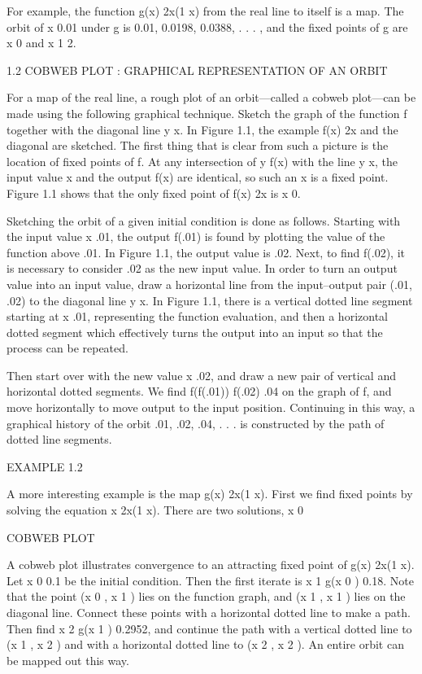 \documentclass[12pt]{article}
\begin{document}
For example, the function g(x)  2x(1  x) from the real line to itself is a map. The orbit of x  0.01 under 
g is 0.01, 0.0198, 0.0388, . . .  , and the fixed points of g are x  0 and x  1  2.

1.2 COBWEB PLOT : GRAPHICAL REPRESENTATION OF AN ORBIT

For a map of the real line, a rough plot of an orbit—called a cobweb plot—can be made using the following 
graphical technique. Sketch the graph of the function f together with the diagonal line y  x. In Figure 
1.1, the example f(x)  2x and the diagonal are sketched. The first thing that is clear from such a picture 
is the location of fixed points of f. At any intersection of y  f(x) with the line y  x,
the input value x and the output f(x) are identical, so such an x is a fixed point. Figure 1.1 shows that 
the only fixed point of f(x)  2x is x  0.

Sketching the orbit of a given initial condition is done as follows. Starting with the input value x  .01, 
the output f(.01) is found by plotting the value of the function above .01. In Figure 1.1, the output value 
is .02. Next, to find f(.02), it is necessary to consider .02 as the new input value. In order to turn an 
output value into an input value, draw a horizontal line from the input–output pair (.01, .02) to the 
diagonal line y  x. In Figure 1.1, there is a vertical dotted line segment starting at x  .01, representing 
the function evaluation, and then a horizontal dotted segment which effectively turns the output into an 
input so that the process can be repeated.

Then start over with the new value x  .02, and draw a new pair of vertical and horizontal dotted segments. 
We find f(f(.01))  f(.02)  .04 on the graph of f, and move horizontally to move output to the input 
position. Continuing in this way, a graphical history of the orbit .01, .02, .04, . . .  is constructed by 
the path of dotted line segments.

EXAMPLE 1.2

A more interesting example is the map g(x)  2x(1  x). First we find fixed points by solving the equation x  
2x(1  x). There are two solutions, x  0

COBWEB PLOT

A cobweb plot illustrates convergence to an attracting fixed point of g(x)  2x(1  x). Let x 0  0.1 be the 
initial condition. Then the first iterate is x 1  g(x 0 )  0.18. Note that the point (x 0 , x 1 ) lies on 
the function graph, and (x 1 , x 1 ) lies on the diagonal line. Connect these points with a horizontal 
dotted line to make a path. Then find x 2  g(x 1 )  0.2952, and continue the path with a vertical dotted 
line to (x 1 , x 2 ) and with a horizontal dotted line to (x 2 , x 2 ). An entire orbit can be mapped out 
this way.
\end{document}
